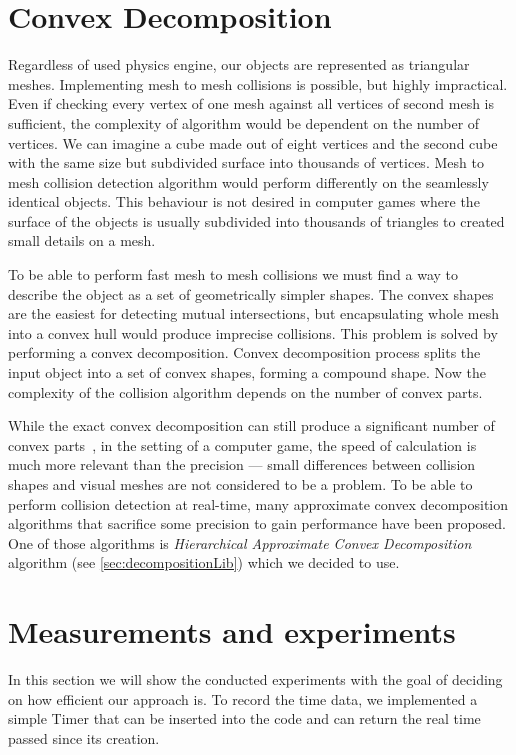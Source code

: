 \section{Convex Decomposition}
\label{sec:decomposition}
Regardless of used physics engine, our objects are represented as triangular meshes. Implementing mesh to mesh collisions is possible, but highly impractical. Even if checking every vertex of one mesh against all vertices of second mesh is sufficient, the complexity of algorithm would be dependent on the number of vertices. We can imagine a cube made out of eight vertices and the second cube with the same size but subdivided surface into thousands of vertices. Mesh to mesh collision detection algorithm would perform differently on the seamlessly identical objects. This behaviour is not desired in computer games where the surface of the objects is usually subdivided into thousands of triangles to created small details on a mesh.

To be able to perform fast mesh to mesh collisions we must find a way to describe the object as a set of geometrically simpler shapes. The convex shapes are the easiest for detecting mutual intersections, but encapsulating whole mesh into a convex hull would produce imprecise collisions. This problem is solved by performing a convex decomposition. Convex decomposition process splits the input object into a set of convex shapes, forming a compound shape. Now the complexity of the collision algorithm depends on the number of convex parts. 

While the exact convex decomposition can still produce a significant number of convex parts~\cite{convexDecomp}, in the setting of a computer game, the speed of calculation is much more relevant than the precision --- small differences between collision shapes and visual meshes are not considered to be a problem. To be able to perform collision detection at real-time, many approximate convex decomposition algorithms that sacrifice some precision to gain performance have been proposed. One of those algorithms is \emph{Hierarchical Approximate Convex Decomposition} algorithm (see \cref{sec:decompositionLib}) which we decided to use.

\section{Measurements and experiments}
\label{sec:testing}
In this section we will show the conducted experiments with the goal of deciding on how efficient our approach is.
To record the time data, we implemented a simple Timer that can be inserted into the code and can return the real time passed since its creation. 

